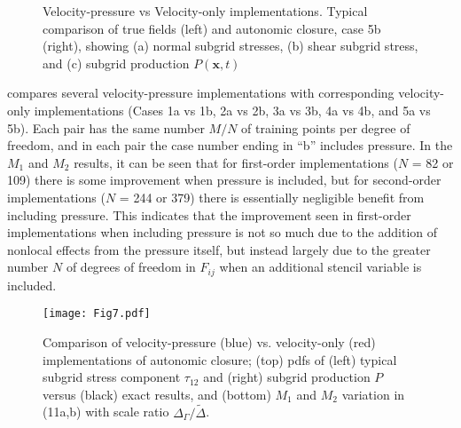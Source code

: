 %
\begin{figure}
	\centering %
	\label{F:NG2pa}
\end{figure}
%
\begin{figure}
	\ContinuedFloat
	\centering %
	\label{F:NG2pb}
\end{figure}
%
\begin{figure}
	\ContinuedFloat
	\centering %
	\label{F:NG2pc}
\end{figure}
%
\begin{figure}
	\ContinuedFloat
	\caption{Velocity-pressure vs Velocity-only implementations. Typical comparison of  true fields (left) and autonomic closure, case 5b (right), showing (a) normal subgrid stresses, (b) shear subgrid stress, and (c) subgrid production $P(\mathbf{x},t)$}
	\label{F:NG2p}
\end{figure}
%
%



  compares several velocity-pressure implementations with corresponding velocity-only implementations (Cases 1a vs 1b, 2a vs 2b, 3a vs 3b, 4a vs 4b, and 5a vs 5b). Each pair has the same number $M/N$  of training points per degree of freedom, and in each pair the case number ending in “b” includes pressure. In the $M_1$  and $M_2$  results, it can be seen that for first-order implementations ($N$ = 82 or 109) there is some improvement when pressure is included, but for second-order implementations ($N$ = 244 or 379) there is essentially negligible benefit from including pressure. This indicates that the improvement seen in first-order implementations when including pressure is not so much due to the addition of nonlocal effects from the pressure itself, but instead largely due to the greater number $N$ of degrees of freedom in $F_{ij}$  when an additional stencil variable is included. 

%
\begin{figure}
	\begin{center}
	\texttt{[image: Fig7.pdf]}
	\caption{ Comparison of velocity-pressure (blue) vs. velocity-only (red) implementations of autonomic closure; (top) pdfs of (left) typical subgrid stress component $\tau_{12}$ and (right) subgrid production $P$ versus (black) exact results, and (bottom) $M_1$ and $M_2$ variation in (11a,b) with scale ratio $\Delta_{\Gamma}/\widetilde{\Delta}$. }
	\label{F:7}
	\end{center}
\end{figure}
%
%


